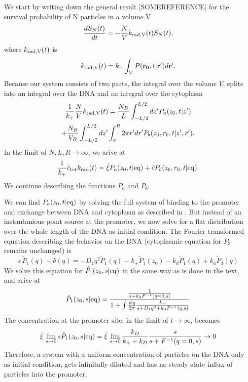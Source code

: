 \documentclass[a4paper,10pt]{article}
\begin{document}
We start by writing down the general result [SOMEREFERENCE] for the survival probability of N particles in a volume V
\begin{equation}
 \frac{dS_N(t)}{dt} = -\frac{N}{V} k_{\rm rad, V}(t) S_N(t),
 \elabel{SN}
\end{equation}
where $k_{\rm rad, V}(t)$ is
\begin{equation}
 k_{\rm rad, V}(t) = k_+ \int_V P({\bf r_0}, t|{\bf r'}) d{\bf r'}.
\end{equation}
Because our system consists of two parts, the integral over the volume $V$, splits into an integral over the DNA and an integral over the cytoplasm
\begin{gather}
 \frac{1}{k_+} \frac{N}{V} k_{\rm rad, V}(t) = \frac{N_D}{L} \int_{-L/2}^{L/2} dz' P_a(z_0, t|z') \nonumber \\ +  \frac{N_B}{V_B} \int_{-L/2}^{L/2} dz' \int_{\sigma}^{R} 2\pi r' dr' P_b(z_0, r_0,t|z', r').
\end{gather}
In the limit of $N, L, R \to \infty$, we arive at
\begin{equation}
 \elabel{krad_inf}
 \frac{1}{k_+} \bar{c}_{\rm tot} k_{\rm rad}(t) = \bar{\xi} P_a(z_0, t|{\rm eq}) +  \bar{c} P_b(z_0, r_0,t|{\rm eq}).
\end{equation}
We continue describing the functions $P_a$ and $P_b$. 

We can find $P_a(z_0,t|{\rm eq})$ by solving the full system of binding to the promoter and exchange between DNA and cytoplasm as described in . But instead of an instantanious point source at the promoter, we now solve for a flat distribution over the whole length of the DNA as initial condition. The Fourier transformed equation describing the behavior on the DNA (cytoplasmic equation for $P_3$ remains unchanged) is
\begin{equation}
  s \, \tilde{P}_1(q) - \delta(q) = - D_1 q^2 \tilde{P}_1(q) - k_+ \tilde{P}_1(z_0) - k_d \tilde{P}_1(q) + k_a \tilde{P}_3(q)
\end{equation}
We solve this equation for $\hat{P}_1(z_0,s|{\rm eq})$ in the same way as is done in the text, and arive at
\begin{equation}
 \elabel{DE_sol_unfrm}
   \hat{P}_1(z_0,s|{\rm eq}) = \frac{\frac{1}{s + k_d F^{-1}(q=0,s)}}{1 + \int \frac{d\,q}{2 \pi} \frac{k_+}{s + D_1 q^2 + k_d F^{-1}(q,s)}}
\end{equation}
The concentration at the promoter site, in the limit of $t \to \infty$, becomes
\begin{equation}
 \bar{\xi} \, \lim_{s \to 0} s \hat{P}_1(z_0,s|{\rm eq}) = \bar{\xi} \, \lim_{s \to 0} \frac{k_D}{k_+ + k_D} \frac{s}{s + F^{-1}(q=0,s)} \to 0
\end{equation}
Therefore, a system with a uniform concentration of particles on the DNA only as initial condition, gets infinitally diluted and has no steady state influx of particles into the promoter.
\end{document}
